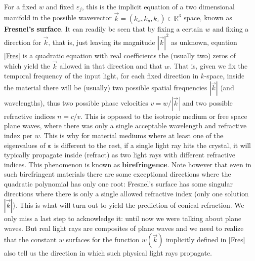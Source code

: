 \documentclass[11pt, a4paper, twoside]{article} %
\newcommand{\R}{\mathbb{R}} %
\begin{document}
For a fixed $w$ and fixed $\varepsilon_j$, this is the implicit equation of a two dimensional manifold in the possible wavevector $\vec{k}=(k_x,k_y,k_z)\in\R^3$ space, known as {\bf Fresnel's surface}. It can readily be seen that by fixing a certain $w$ and fixing a direction for $\vec{k}$, that is, just leaving its magnitude $|\vec{k}|^2$ as unknown, equation \eqref{Fres} is a quadratic equation with real coefficients the (usually two) zeros of which yield the $\vec{k}$ allowed in that direction and that $w$. That is, given we fix the temporal frequency of the input light, for each fixed direction in $k$-space, inside the material there will be (usually) two possible spatial frequencies $|\vec{k}|$ (and wavelengths), thus two possible phase velocities $v=w/|\vec{k}|$ and two possible refractive indices $n=c/v$. This is opposed to the isotropic medium or free space plane waves, where there was only a single acceptable wavelength and refractive index per $w$. This is why for material mediums where at least one of the eigenvalues of $\pmb{\varepsilon}$ is different to the rest, if a single light ray hits the crystal, it will typically propagate inside (refract) as two light rays with different refractive indices. This phenomenon is known as {\bf birefringence}. Note however that even in such birefringent materials there are some exceptional directions where the quadratic polynomial has only one root: Fresnel's surface has some singular directions where there is only a single allowed refractive index (only one solution $|\vec{k}|$). This is what will turn out to yield the prediction of conical refraction. We only miss a last step to acknowledge it: until now we were talking about plane waves. But real light rays are composites of plane waves and we need to realize that the constant $w$ surfaces for the function $w(\vec{k})$ implicitly defined in \eqref{Fres} also tell us the direction in which such physical light rays propagate.
\end{document}
